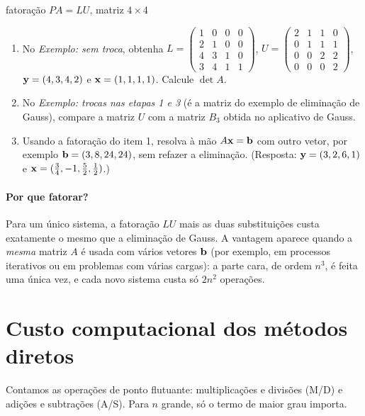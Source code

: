 \begin{atividade}{fatoração $PA=LU$, matriz $4\times4$}{\arqLUquatro}
\begin{enumerate}[nosep]
  \item No \emph{Exemplo: sem troca}, obtenha
  $L=\left(\begin{smallmatrix}1&0&0&0\\2&1&0&0\\4&3&1&0\\3&4&1&1\end{smallmatrix}\right)$,
  $U=\left(\begin{smallmatrix}2&1&1&0\\0&1&1&1\\0&0&2&2\\0&0&0&2\end{smallmatrix}\right)$,
  $\mathbf{y}=(4,3,4,2)$ e $\mathbf{x}=(1,1,1,1)$. Calcule $\det A$.
  \item No \emph{Exemplo: trocas nas etapas 1 e 3} (é a matriz do exemplo de eliminação de
  Gauss), compare a matriz $U$ com a matriz $B_3$ obtida no aplicativo de Gauss.
  \item Usando a fatoração do item 1, resolva à mão $A\mathbf{x}=\mathbf{b}$ com outro vetor, por exemplo
  $\mathbf{b}=(3,8,24,24)$, sem refazer a eliminação. (Resposta: $\mathbf{y}=(3,2,6,1)$ e
  $\mathbf{x}=(\frac34,-1,\frac52,\frac12)$.)
\end{enumerate}
\end{atividade}

\paragraph{Por que fatorar?} Para um único sistema, a fatoração $LU$ mais as duas substituições
custa exatamente o mesmo que a eliminação de Gauss. A vantagem aparece quando a \emph{mesma}
matriz $A$ é usada com vários vetores $\mathbf{b}$ (por exemplo, em processos iterativos ou em
problemas com várias cargas): a parte cara, de ordem $n^3$, é feita uma única vez, e cada novo
sistema custa só $2n^2$ operações.

\section{Custo computacional dos métodos diretos}

Contamos as operações de ponto flutuante: multiplicações e divisões (M/D) e adições e
subtrações (A/S). Para $n$ grande, só o termo de maior grau importa.

